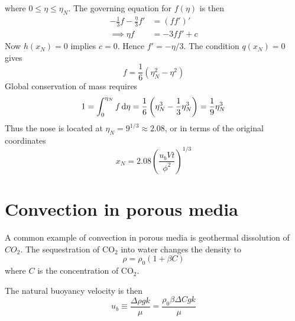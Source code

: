 \documentclass{jknotes}
\begin{document}
where $0 \le \eta \le \eta_N$. The governing equation for $f(\eta)$ is then
\begin{align}
	-\frac{1}{3}f - \frac{\eta}{3}f' &= (ff')' \\
	\implies \eta f &= -3ff' + c
\end{align}
Now $h(x_N) = 0$ implies $c=0$. Hence $f' = -\eta/3$. The condition $q(x_N) =
0$ gives
\begin{equation}
	f = \frac{1}{6}\left(\eta^2_N - \eta^2\right)
\end{equation}
Global conservation of mass requires
\begin{equation}
	1 = \int_0^{\eta_N} f  \, \diffd \eta = \frac{1}{6}\left( \eta_N^3 -
	\frac{1}{3}\eta_N^3\right) = \frac{1}{9}\eta_N^3
\end{equation}
Thus the nose is located at $\eta_N = 9^{1/3} \approx 2.08$, or in terms of
the original coordinates
\begin{equation}
	x_N= 2.08 \left( \frac{u_b V t}{\phi^2}\right)^{1/3}
\end{equation}

\section{Convection in porous media}
A common example of convection in porous media is geothermal dissolution of
$CO_2$. The sequestration of CO$_2$ into water changes the density to
\begin{equation}
	\rho = \rho_0 (1+\beta C)
\end{equation}
where $C$ is the concentration of CO$_2$. 

\begin{center}
\end{center}

The natural buoyancy velocity is then
\begin{equation}
	u_b \equiv \frac{\Delta \rho g k }{\mu} = \frac{\rho_0 \beta \Delta C g
	k}{\mu}
\end{equation}
\end{document}
